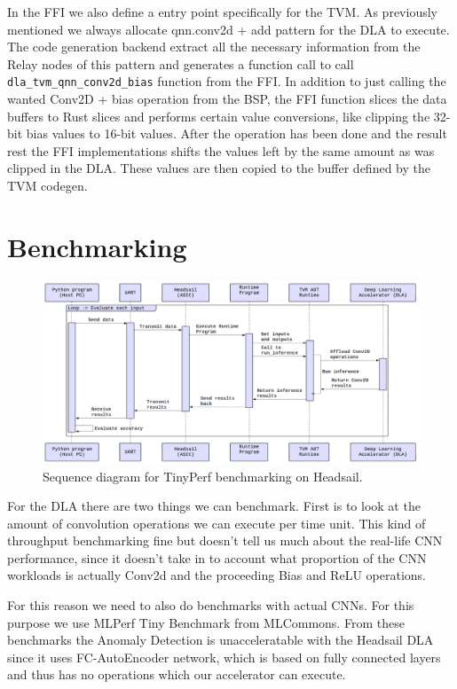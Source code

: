 \documentclass[12pt,a4paper,english
]{tunithesis}
\begin{document}
In the FFI we also define a entry point specifically for the TVM. As previously mentioned we always allocate qnn.conv2d + add pattern for the DLA to execute. The code generation backend extract all the necessary information from the Relay nodes of this pattern and generates a function call to call \texttt{dla\_tvm\_qnn\_conv2d\_bias} function from the FFI. In addition to just calling the wanted Conv2D + bias operation from the BSP, the FFI function slices the data buffers to Rust slices and performs certain value conversions, like clipping the 32-bit bias values to 16-bit values. After the operation has been done and the result rest the FFI implementations shifts the values left by the same amount as was clipped in the DLA. These values are then copied to the buffer defined by the TVM codegen.

\section{Benchmarking}
\begin{figure}
  \centering
  \includegraphics[width=\linewidth]{img/benchmark-sequence.pdf}
  \caption{Sequence diagram for TinyPerf benchmarking on Headsail.}
  \label{fig:dla_internal}
\end{figure}


For the DLA there are two things we can benchmark. First is to look at the amount of convolution operations we can execute per time unit. This kind of throughput benchmarking fine but doesn't tell us much about the real-life CNN performance, since it doesn't take in to account what proportion of the CNN workloads is actually Conv2d and the proceeding Bias and ReLU operations.

For this reason we need to also do benchmarks with actual CNNs. For this purpose we use MLPerf Tiny Benchmark from MLCommons.
From these benchmarks the Anomaly Detection is unacceleratable with the Headsail DLA since it uses FC-AutoEncoder network, which is based on fully connected layers and thus has no operations which our accelerator can execute.
\end{document}
